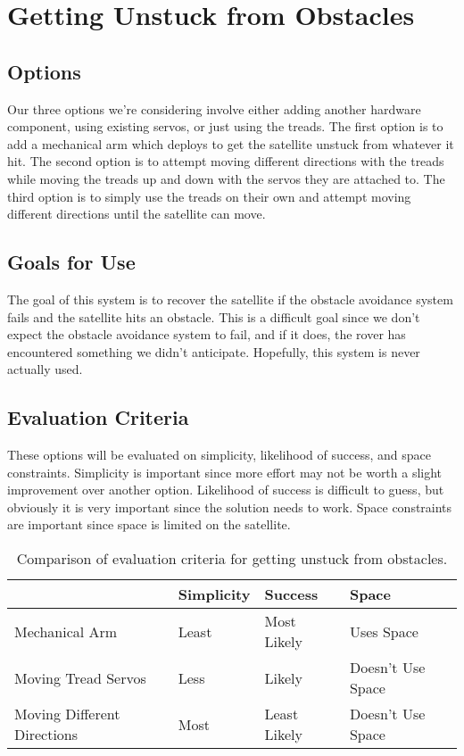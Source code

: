 \documentclass[10pt,serif,draftclsnofoot,onecolumn]{IEEEtran}
\begin{document}
\section{Getting Unstuck from Obstacles}

\subsection{Options}
Our three options we’re considering involve either adding another hardware component, using existing servos, or just using the treads. The first option is to add a mechanical arm which deploys to get the satellite unstuck from whatever it hit. The second option is to attempt moving different directions with the treads while moving the treads up and down with the servos they are attached to. The third option is to simply use the treads on their own and attempt moving different directions until the satellite can move. 

\subsection{Goals for Use}
The goal of this system is to recover the satellite if the obstacle avoidance system fails and the satellite hits an obstacle. This is a difficult goal since we don’t expect the obstacle avoidance system to fail, and if it does, the rover has encountered something we didn’t anticipate. Hopefully, this system is never actually used. 

\subsection{Evaluation Criteria}
These options will be evaluated on simplicity, likelihood of success, and space constraints. Simplicity is important since more effort may not be worth a slight improvement over another option. Likelihood of success is difficult to guess, but obviously it is very important since the solution needs to work. Space constraints are important since space is limited on the satellite.

\begin{table}[h!]
  \centering
  \caption{Comparison of evaluation criteria for getting unstuck from obstacles.}
  \label{tab:table1}
  \begin{tabular}{l||l|l|l}
                                 & Simplicity & Success      & Space \\
    \hline
    Mechanical Arm               & Least      & Most Likely  & Uses Space  \\
    \hline
    Moving Tread Servos          & Less       & Likely       & Doesn't Use Space \\
    \hline
    Moving Different Directions  & Most       & Least Likely & Doesn't Use Space  \\
  \end{tabular}
\end{table}
\end{document}
